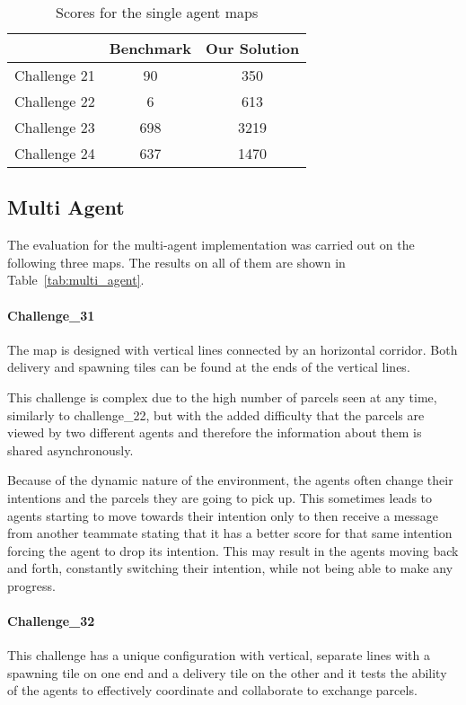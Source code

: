 \begin{table}
    \centering
    \begin{tabular}{c || c c} \hline
                     & Benchmark & Our Solution \\ \hline
        Challenge 21 & 90        & 350          \\
        Challenge 22 & 6         & 613          \\
        Challenge 23 & 698       & 3219         \\
        Challenge 24 & 637       & 1470         \\  \hline
    \end{tabular}
    \caption{Scores for the single agent maps}
    \label{tab:single_agent}
\end{table}


\subsection{Multi Agent}
The evaluation for the multi-agent implementation was carried out on the following three maps. The results on all of them are shown in Table~\ref{tab:multi_agent}.


\paragraph{Challenge\_31} The map is designed with vertical lines connected by an horizontal corridor. Both delivery and spawning tiles can be found at the ends of the vertical lines.

This challenge is complex due to the high number of parcels seen at any time, similarly to challenge\_22, but with the added difficulty that the parcels are viewed by two different agents and therefore the information about them is shared asynchronously.

Because of the dynamic nature of the environment, the agents often change their intentions and the parcels they are going to pick up. This sometimes leads to agents starting to move towards their intention only to then receive a message from another teammate stating that it has a better score for that same intention forcing the agent to drop its intention. This may result in the agents moving back and forth, constantly switching their intention, while not being able to make any progress.

\paragraph{Challenge\_32}  This challenge has a unique configuration with vertical, separate lines with a spawning tile on one end and a delivery tile on the other and it tests the ability of the agents to effectively coordinate and collaborate to exchange parcels.

